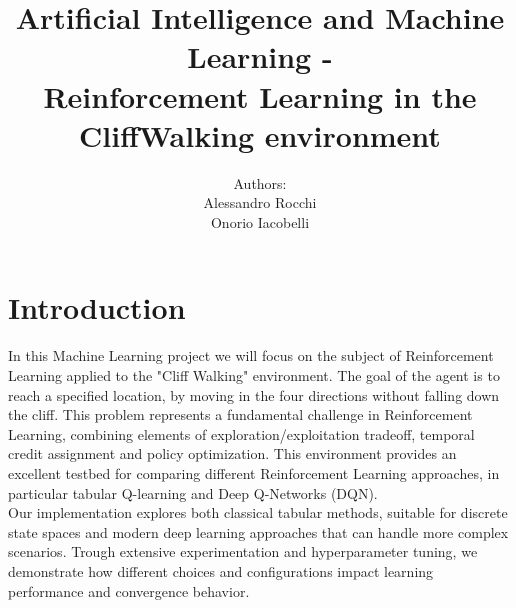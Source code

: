 \documentclass[a4paper,12pt]{article}
\title{Artificial Intelligence and Machine Learning -\\Reinforcement Learning in the CliffWalking environment}
\date{}
\author{Authors:\\Alessandro Rocchi\\Onorio Iacobelli}
\begin{document}
\maketitle

\tableofcontents

\newpage

\section{Introduction}
In this Machine Learning project we will focus on the subject of Reinforcement Learning applied to the "Cliff Walking" environment. The goal of the agent is to reach a specified location, by moving in the four directions without falling down the cliff. This problem represents a fundamental challenge in Reinforcement Learning, combining elements of exploration/exploitation tradeoff, temporal credit assignment and policy optimization. This environment provides an excellent testbed for comparing different Reinforcement Learning approaches, in particular tabular Q-learning and Deep Q-Networks (DQN).
\vspace{0,5cm}\\
Our implementation explores both classical tabular methods, suitable for discrete state spaces and modern deep learning approaches that can handle more complex scenarios. Trough extensive experimentation and hyperparameter tuning, we demonstrate how different choices and configurations impact learning performance and convergence behavior. 
\end{document}
